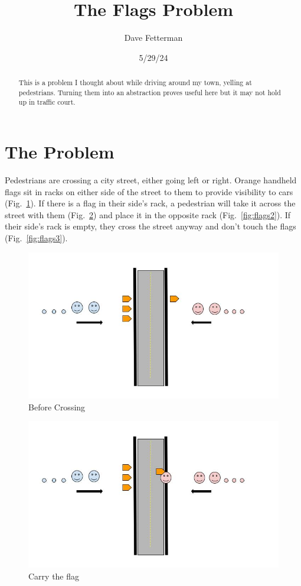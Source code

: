 \documentclass[11pt, oneside]{article} 	%
\title{The Flags Problem}
\author{Dave Fetterman}
\affil{Obviously Unemployed}
\date{5/29/24}
\begin{document}
\maketitle

\begin{abstract}

This is a problem I thought about while driving around my town, yelling at pedestrians. Turning them into an abstraction proves useful here but it may not hold up in traffic court.


\end{abstract}

\section{The Problem}

Pedestrians are crossing a city street, either going left or right.
Orange handheld flags sit in racks on either side of the street to them to provide visibility to cars (Fig.~\ref{fig:flags0}).
If there is a flag in their side's rack, a pedestrian will take it across the street with them (Fig.~\ref{fig:flags1}) and place it in the opposite rack (Fig.~\ref{fig:flags2}).
If their side's rack is empty, they cross the street anyway and don't touch the flags (Fig.~\ref{fig:flags3}).


\begin{figure}[!htb]
\centering
\includegraphics[scale=.3]{flags0}
\caption{Before Crossing}
\label{fig:flags0}
\end{figure}

\begin{figure}[!htb]
\centering
\includegraphics[scale=.3]{flags1}
\caption{Carry the flag}
\label{fig:flags1}
\end{figure}
\end{document}
